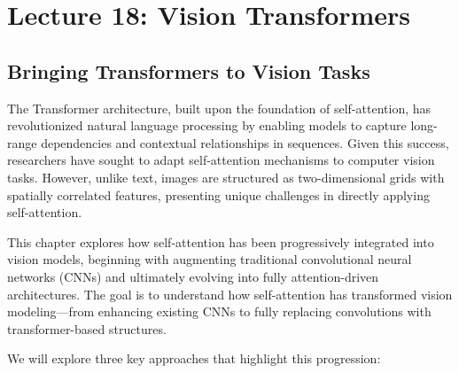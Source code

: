 
\chapter{Lecture 18: Vision Transformers}


\section{Bringing Transformers to Vision Tasks}
\label{sec:chapter18_intro}

\noindent The Transformer architecture, built upon the foundation of self-attention, has revolutionized natural language processing by enabling models to capture long-range dependencies and contextual relationships in sequences. Given this success, researchers have sought to adapt self-attention mechanisms to computer vision tasks. However, unlike text, images are structured as two-dimensional grids with spatially correlated features, presenting unique challenges in directly applying self-attention.

\noindent This chapter explores how self-attention has been progressively integrated into vision models, beginning with augmenting traditional convolutional neural networks (CNNs) and ultimately evolving into fully attention-driven architectures. The goal is to understand how self-attention has transformed vision modeling—from enhancing existing CNNs to fully replacing convolutions with transformer-based structures.

\noindent We will explore three key approaches that highlight this progression:

